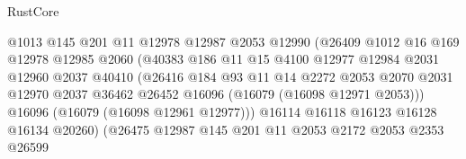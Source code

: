 \begin{lexlean}{RustCore}
\begin{coremodule}
                                  @1013
                                  @145
                                  @201
                                  @11
                                  @12978
                                  @12987
                                  @2053
                                  @12990
                                  (@26409
                                    @1012
                                    @16
                                    @169
                                    @12978
                                    @12985
                                    @2060
                                    (@40383
                                      @186
                                      @11
                                      @15
                                      @4100
                                      @12977
                                      @12984
                                      @2031
                                      @12960
                                      @2037
                                      @40410
                                      (@26416
                                        @184
                                        @93
                                        @11
                                        @14
                                        @2272
                                        @2053
                                        @2070
                                        @2031
                                        @12970
                                        @2037
                                        @36462
                                        @26452
                                        @16096
                                        (@16079 (@16098 @12971 @2053)))
                                      @16096
                                      (@16079 (@16098 @12961 @12977)))
                                    @16114
                                    @16118
                                    @16123
                                    @16128
                                    @16134
                                    @20260)
                                  (@26475
                                    @12987
                                    @145
                                    @201
                                    @11
                                    @2053
                                    @2172
                                    @2053
                                    @2353
                                    @26599

\end{coremodule}
\end{lexlean}
